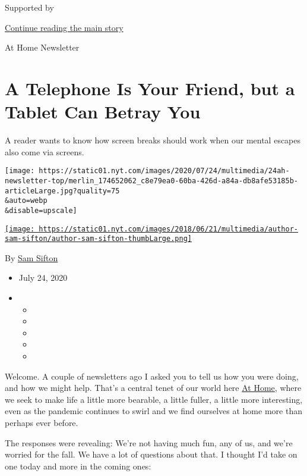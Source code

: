 Supported by

\protect\hyperlink{after-sponsor}{Continue reading the main story}

At Home Newsletter

\hypertarget{a-telephone-is-your-friend-but-a-tablet-can-betray-you}{%
\section{A Telephone Is Your Friend, but a Tablet Can Betray
You}\label{a-telephone-is-your-friend-but-a-tablet-can-betray-you}}

A reader wants to know how screen breaks should work when our mental
escapes also come via screens.

\texttt{[image: https://static01.nyt.com/images/2020/07/24/multimedia/24ah-newsletter-top/merlin\_174652062\_c8e79ea0-60ba-426d-a84a-db8afe53185b-articleLarge.jpg?quality=75\\\&auto=webp\\\&disable=upscale]}

\href{https://www.nytimes.com/by/sam-sifton}{\texttt{[image: https://static01.nyt.com/images/2018/06/21/multimedia/author-sam-sifton/author-sam-sifton-thumbLarge.png]}}

By \href{https://www.nytimes.com/by/sam-sifton}{Sam Sifton}

\begin{itemize}
\item
  July 24, 2020
\item
  \begin{itemize}
  \item
  \item
  \item
  \item
  \item
  \end{itemize}
\end{itemize}

Welcome. A couple of newsletters ago I asked you to tell us how you were
doing, and how we might help. That's a central tenet of our world here
\href{http://www.nytimes.com/athome}{At Home}, where we seek to make
life a little more bearable, a little fuller, a little more interesting,
even as the pandemic continues to swirl and we find ourselves at home
more than perhaps ever before.

The responses were revealing: We're not having much fun, any of us, and
we're worried for the fall. We have a lot of questions about that. I
thought I'd take on one today and more in the coming ones:

